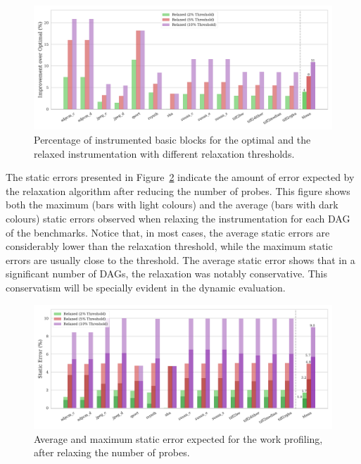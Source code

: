 \begin{figure}[ht]
    \centering
    \includegraphics[width=\textwidth]{figs/num-probes-improvement.pdf}
    \caption{Percentage of instrumented basic blocks for the optimal and the relaxed instrumentation with different relaxation thresholds.}
    \label{fig:num-probes-improvement}
\end{figure}

The static errors presented in Figure~\ref{fig:static-instr-error} indicate the amount of error expected by the relaxation algorithm after reducing the number of probes.
This figure shows both the maximum (bars with light colours) and the average (bars with dark colours) static errors observed when relaxing the instrumentation for each DAG of the benchmarks.
Notice that, in most cases, the average static errors are considerably lower than the relaxation threshold, while the maximum static errors are usually close to the threshold.
The average static error shows that in a significant number of DAGs, the relaxation was notably conservative.
This conservatism will be specially evident in the dynamic evaluation.

\begin{figure}[ht]
    \centering
    \includegraphics[width=\textwidth]{figs/instr-error.pdf}
    \caption{Average and maximum static error expected for the work profiling, after relaxing the number of probes.}
    \label{fig:static-instr-error}
\end{figure}


